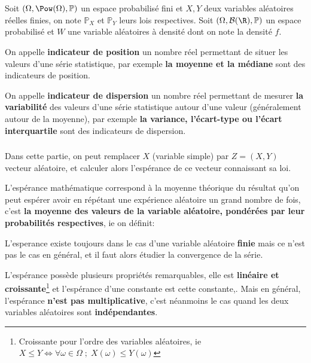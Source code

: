 \chapter*{} %

Soit \((\Omega, \Pow(\Omega), \mathbb{P})\) un espace probabilisé fini et \(X, Y\) deux variables aléatoires réelles finies, on note \(\mathbb{P}_X\) et \(\mathbb{P}_Y\) leurs lois respectives. \+
Soit \((\Omega, \mathcal{B}(\R), \mathbb{P})\) un espace probabilisé et \(W\) une variable aléatoires à densité dont on note la densité \(f\). \<

On appelle \textbf{indicateur de position} un nombre réel permettant de situer les valeurs d'une série statistique, par exemple \textbf{la moyenne et la médiane} sont des indicateurs de position.\<

On appelle \textbf{indicateur de dispersion} un nombre réel permettant de mesurer \textbf{la variabilité} des valeurs d'une série statistique autour d'une valeur (généralement autour de la moyenne), par exemple \textbf{la variance, l'écart-type ou l'écart interquartile} sont des indicateurs de dispersion.

\subsection*{}
Dans cette partie, on peut remplacer \(X\) (variable simple) par \(Z = (X, Y)\) vecteur aléatoire, et calculer alors l'espérance de ce vecteur connaissant sa loi.\<

L'espérance mathématique correspond à la moyenne théorique du résultat qu'on peut espérer avoir en répétant une expérience aléatoire un grand nombre de fois, c'est \textbf{la moyenne des valeurs de la variable aléatoire, pondérées par leur probabilités respectives}, ie on définit:

L'esperance existe toujours dans le cas d'une variable aléatoire \textbf{finie} mais ce n'est pas le cas en général, et il faut alors étudier la convergence de la série. \<

L'espérance possède plusieurs propriétés remarquables, elle est \textbf{linéaire et croissante}\footnote[1]{Croissante pour l'ordre des variables aléatoires, ie \(X \leq Y \Longleftrightarrow \forall \omega \in \Omega \; ; \; X(\omega) \leq Y(\omega)\)} et l'espérance d'une constante est cette constante,.\+
Mais en général, l'espérance \textbf{n'est pas multiplicative}, c'est néanmoins le cas quand les deux variables aléatoires sont \textbf{indépendantes}.\<


